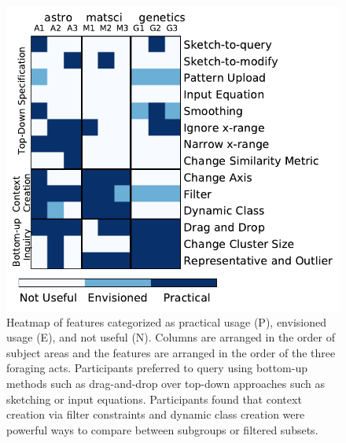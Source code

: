\begin{figure}[h!]
    \centering
    \includegraphics[width=0.7\columnwidth]{figures/PENcoding.pdf}
    \vspace{-6pt}\caption{Heatmap of features categorized as practical usage (P), envisioned usage (E), and not useful (N). Columns are arranged in the order of subject areas and the features are arranged in the order of the three foraging acts. Participants preferred to query using bottom-up methods such as drag-and-drop over top-down approaches such as sketching or input equations. Participants found that context creation via filter constraints and dynamic class creation were powerful ways to compare between subgroups or filtered subsets.}
    \label{feature_heatmap}
    \vspace{-5pt}
\end{figure}
